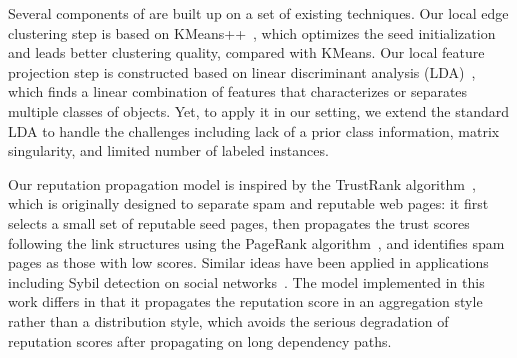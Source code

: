 Several components of \tool are built up on a set of existing techniques. Our local edge clustering step is based on KMeans++~\cite{Arthur:2007:KAC:1283383.1283494}, which optimizes the seed initialization and leads better clustering quality, compared with KMeans. Our local feature projection step is constructed based on linear discriminant analysis (LDA)~\cite{Mika99fisherdiscriminant}, which finds a linear combination of features that characterizes or separates multiple classes of objects. Yet, to apply it in our setting, we extend the standard LDA to handle the challenges including lack of a prior class information, matrix singularity, and limited number of labeled instances. 

Our reputation propagation model is inspired by the TrustRank algorithm~\cite{Gyongyi:2004:vldb}, which is originally designed to separate spam and reputable web pages: it first selects a small set of reputable seed pages, then propagates the trust scores following the link structures using the PageRank algorithm~\cite{Page:techreport:1998}, and identifies spam pages as those with low scores. Similar ideas have been applied in applications including Sybil detection on social networks~\cite{cao2012sybilrank,Gong:2014:tifs,gao2018sybilfuse}.
The model implemented in this work differs in that it propagates the reputation score in an aggregation style rather than a distribution style, which avoids the serious degradation of reputation scores after propagating on long dependency paths.

